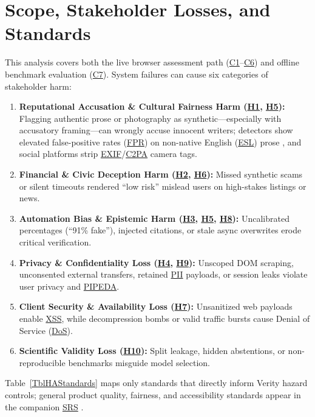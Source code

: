 \documentclass[11pt]{article}
\newcommand{\CTwoPA}{\hyperlink{ha-acr-c2pa}{C2PA}}
\newcommand{\DoS}{\hyperlink{ha-acr-dos}{DoS}}
\newcommand{\ESL}{\hyperlink{ha-acr-esl}{ESL}}
\newcommand{\EXIF}{\hyperlink{ha-acr-exif}{EXIF}}
\newcommand{\FPR}{\hyperlink{ha-acr-fpr}{FPR}}
\newcommand{\PII}{\hyperlink{ha-acr-pii}{PII}}
\newcommand{\PIPEDA}{\hyperlink{ha-acr-pipeda}{PIPEDA}}
\newcommand{\SRS}{\hyperlink{ha-acr-srs}{SRS}}
\newcommand{\XSS}{\hyperlink{ha-acr-xss}{XSS}}
\begin{document}
\section{Scope, Stakeholder Losses, and Standards}\label{sec:scope}

This analysis covers both the live browser assessment path (\hyperref[comp:C1]{C1}--\hyperref[comp:C6]{C6}) and offline benchmark evaluation (\hyperref[comp:C7]{C7}). System failures can cause six categories of stakeholder harm:

\begin{enumerate}[leftmargin=*, noitemsep]
    \item \textbf{Reputational Accusation \& Cultural Fairness Harm (\hyperref[haz:H1]{H1}, \hyperref[haz:H5]{H5}):} Flagging authentic prose or photography as synthetic—especially with accusatory framing—can wrongly accuse innocent writers; detectors show elevated false-positive rates (\FPR{}) on non-native English (\ESL{}) prose \cite{Liang2023ESL}, and social platforms strip \EXIF{}/\CTwoPA{} camera tags.
    \item \textbf{Financial \& Civic Deception Harm (\hyperref[haz:H2]{H2}, \hyperref[haz:H6]{H6}):} Missed synthetic scams or silent timeouts rendered ``low risk'' mislead users on high-stakes listings or news.
    \item \textbf{Automation Bias \& Epistemic Harm (\hyperref[haz:H3]{H3}, \hyperref[haz:H5]{H5}, \hyperref[haz:H8]{H8}):} Uncalibrated percentages (``91\% fake''), injected citations, or stale async overwrites erode critical verification.
    \item \textbf{Privacy \& Confidentiality Loss (\hyperref[haz:H4]{H4}, \hyperref[haz:H9]{H9}):} Unscoped DOM scraping, unconsented external transfers, retained \PII{} payloads, or session leaks violate user privacy and \PIPEDA{}.
    \item \textbf{Client Security \& Availability Loss (\hyperref[haz:H7]{H7}):} Unsanitized web payloads enable \XSS{}, while decompression bombs or valid traffic bursts cause Denial of Service (\DoS{}).
    \item \textbf{Scientific Validity Loss (\hyperref[haz:H10]{H10}):} Split leakage, hidden abstentions, or non-reproducible benchmarks misguide model selection.
\end{enumerate}

Table~\ref{TblHAStandards} maps only standards that directly inform Verity hazard controls; general product quality, fairness, and accessibility standards appear in the companion \SRS{} \cite{VeritySRS2026}.
\end{document}
